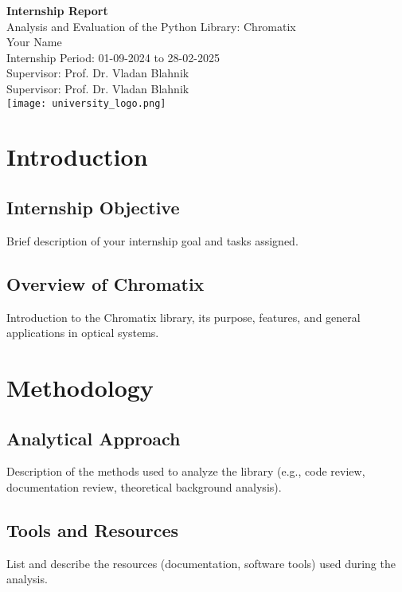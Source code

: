 \documentclass[a4paper,12pt]{report}
\begin{document}
\begin{titlepage}
    \centering
    \vspace*{2cm}
    {\Huge\bfseries Internship Report\\[0.3cm]}
    \vspace{1cm}
    {\LARGE Analysis and Evaluation of the Python Library: Chromatix}\\[1.5cm]
    {\large Your Name}\\[0.2cm]
    {\large Internship Period: 01-09-2024 to 28-02-2025}\\[0.2cm]
    {\large Supervisor: Prof. Dr. Vladan Blahnik}\\[2cm]
    {\large Supervisor: Prof. Dr. Vladan Blahnik}\\[2cm]
    \texttt{[image: university\_logo.png]}\\[2cm]
    \vfill
\end{titlepage}

\tableofcontents
\newpage

\chapter{Introduction}
\section{Internship Objective}
Brief description of your internship goal and tasks assigned.

\section{Overview of Chromatix}
Introduction to the Chromatix library, its purpose, features, and general applications in optical systems.

\chapter{Methodology}
\section{Analytical Approach}
Description of the methods used to analyze the library (e.g., code review, documentation review, theoretical background analysis).

\section{Tools and Resources}
List and describe the resources (documentation, software tools) used during the analysis.
\end{document}
